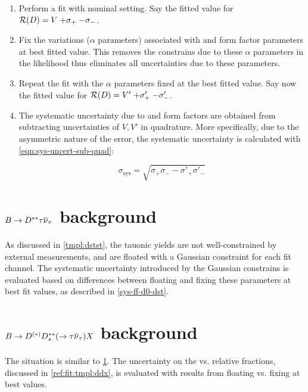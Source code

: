 \begin{enumerate}
    \item Perform a fit with nominal setting. Say the fitted value for
        $\mathcal{R}(D) = V\;{+\sigma_+}\;{-\sigma_-}$.
    \item Fix the variations ($\alpha$ parameters) associated with \Dz and
        \Dstar form factor parameters at best fitted value.
        This removes the constrains due to these $\alpha$ parameters in the
        likelihood thus
        eliminates all uncertainties due to these parameters.
    \item Repeat the fit with the $\alpha$ parameters fixed at the best fitted
        value.
        Say now the fitted value for
        $\mathcal{R}(D) = V'\;{+\sigma'_+}\;{-\sigma'_-}$.
    \item The systematic uncertainty due to \Dz and \Dstar form factors are
        obtained from subtracting uncertainties of $V, V'$ in quadrature.
        More specifically, due to the asymmetric nature of the error,
        the systematic uncertainty is calculated with
        \cref{eqn:sys-uncert-sub-quad}:

        \begin{equation}
            \sigma_\text{sys} = \sqrt{\sigma_+ \sigma_- - \sigma'_+ \sigma'_-}
            \label{eqn:sys-uncert-sub-quad}
        \end{equation}
\end{enumerate}


\section{$B \rightarrow D^{**}\tau{\ensuremath{{\overline{\nu}}_\tau}}$ background}
\label{sys-tau-dstst}

As discussed in \cref{tmpl:dstst},
the tauonic yields are not well-constrained by external measurements, and
are floated with a Gaussian constraint for each fit channel.
The systematic uncertainty introduced by the Gaussian constrains
is evaluated based on differences between floating and fixing these parameters
at best fit values, as described in \cref{sys-ff-d0-dst}.


\section{$B \rightarrow D^{(*)} D^{**}_s (\rightarrow \tau{\ensuremath{{\overline{\nu}}_\tau}}) X$ background}
\label{sys-tau-ddx}

The situation is similar to \cref{sys-tau-dstst}.
The uncertainty on the \tauon vs. \muon relative fractions,
discussed in \cref{ref:fit:tmpl:ddx},
is evaluated with results from floating vs. fixing at best values.


